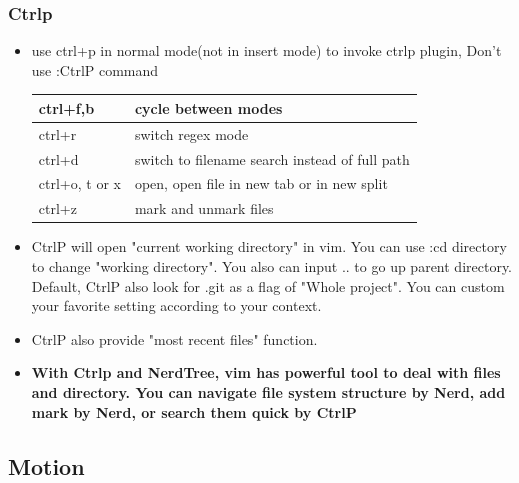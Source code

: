 \documentclass[paper=8.5in:11in, twoside, 12pt, pagesize=pdftex]{book}
\begin{document}
	\subsubsection{Ctrlp}
	\begin{itemize}
		\item use ctrl+p in normal mode(not in insert mode) to invoke ctrlp plugin, Don't use :CtrlP command  \\ 
		\begin{tabular}{|p{}|p{}|}
			\hline 
			ctrl+f,b  & cycle between modes \\ 
			
			\hline 
			ctrl+r & switch regex mode  \\ 
			
			\hline 
			ctrl+d & switch to filename search instead of full path \\ 
			
			\hline 
			ctrl+o, t or x & open, open file in new tab or in new split \\ 
			
			\hline 
			ctrl+z  & mark and unmark files \\ 
			
			\hline 
		\end{tabular} 
		\item CtrlP will open "current working directory" in vim. You can use :cd directory to change "working directory". You also can input .. to go up parent directory. Default, CtrlP also look for .git as a flag of "Whole project". You can custom your favorite setting according to your context.
		
		\item CtrlP also provide "most recent files" function.
		
		\item \textbf{With Ctrlp and NerdTree, vim has powerful tool to deal with files and directory. You can navigate file system structure by Nerd, add mark by Nerd, or search them quick by CtrlP}
	\end{itemize}
	
	\subsection{Motion}
\end{document}
